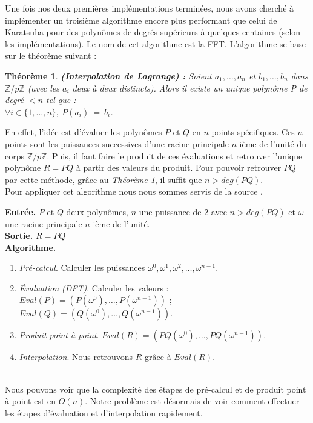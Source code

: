 \documentclass[12pt, a4paper]{article}
\begin{document}
Une fois nos deux premières implémentations terminées, nous avons cherché à implémenter un troisième algorithme encore plus performant que celui de Karatsuba pour des polynômes de degrés supérieurs à quelques centaines (selon les implémentations). Le nom de cet algorithme est la FFT. L'algorithme se base sur le théorème suivant :

\newtheorem{Thm1}{Théorème}
\begin{Thm1}
\label{lagrange}
\textbf{(Interpolation de Lagrange) : }
Soient $a_1,\dots,a_n$ et $b_1,\dots,b_n$ dans $\mathbb{Z}/p\mathbb{Z}$  (avec les $a_i$ deux à deux distincts). Alors il existe un unique polynôme P de degré $< n$ tel que : \\
\indent \indent \indent \indent \indent \indent \indent \indent \indent $\forall i \in \{1,..., n\},\ P(a_i)\ =\ b_i$.
\end{Thm1}

En effet, l’idée est d’évaluer les polynômes $P$ et $Q$ en $n$ points spécifiques. Ces $n$ points sont les puissances successives d'une racine principale $n$-ième de l'unité du corps $\mathbb{Z}/p\mathbb{Z}$. Puis, il faut faire le produit de ces évaluations et retrouver l’unique polynôme $R=PQ$ à partir des valeurs du produit. Pour pouvoir retrouver $PQ$ par cette méthode, grâce au \textit{Théorème \ref{lagrange}}, il suffit que $n > deg(PQ)$. \\ Pour appliquer cet algorithme nous nous sommes servis de la source \cite{AECF}. \\
 
\begin{tcolorbox}[colback=cyan!5!white,
                  colframe=cyan!100!black,
                  title=\textbf{Algorithme de multiplication par FFT}
                 ]
\textbf{Entrée.} $P$ et $Q$ deux polynômes, $n$ une puissance de $2$ avec $n>deg(PQ)$ et $\omega$ une racine principale $n$-ième de l’unité. \\
\textbf{Sortie.} $R = PQ$ \\
\textbf{Algorithme.}
\begin{enumerate}[itemsep=-2ex]
\item\textit{Pré-calcul}. Calculer les puissances $\omega^0,\omega^1,\omega^2,\dots,\omega^{n-1}$. \\
\item\textit{Évaluation (DFT)}. Calculer les valeurs : \\ $Eval(P)=(P(\omega^0),\dots,P(\omega^{n-1}))$ ; $Eval(Q)=(Q(\omega^0),\dots,Q(\omega^{n-1}))$. \\
\item\textit{Produit point à point}. $Eval(R) = (PQ(\omega^0),\dots,PQ(\omega^{n-1}))$. \\
\item\textit{Interpolation}. Nous retrouvons $R$ grâce à $Eval(R)$.
\end{enumerate}
\end{tcolorbox}
\ \\
Nous pouvons voir que la complexité des étapes de pré-calcul et de produit point à point est en $O(n)$. Notre problème est désormais de voir comment effectuer les étapes d'évaluation et d'interpolation rapidement.
\end{document}
